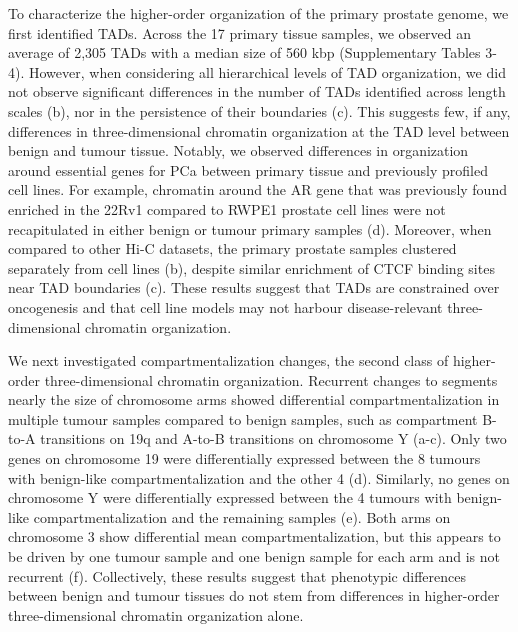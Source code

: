 To characterize the higher-order organization of the primary prostate genome, we first identified TADs.
Across the 17 primary tissue samples, we observed an average of 2,305 TADs with a median size of 560 kbp (Supplementary Tables 3-4).
However, when considering all hierarchical levels of TAD organization, we did not observe significant differences in the number of TADs identified across length scales (b), nor in the persistence of their boundaries (c).
This suggests few, if any, differences in three-dimensional chromatin organization at the TAD level between benign and tumour tissue.
Notably, we observed differences in organization around essential genes for PCa between primary tissue and previously profiled cell lines.
For example, chromatin around the AR gene that was previously found enriched in the 22Rv1 compared to RWPE1 prostate cell lines \cite{rhieHighresolution3DEpigenomic2019} were not recapitulated in either benign or tumour primary samples (d).
Moreover, when compared to other Hi-C datasets, the primary prostate samples clustered separately from cell lines (b), despite similar enrichment of CTCF binding sites near TAD boundaries (c).
These results suggest that TADs are constrained over oncogenesis and that cell line models may not harbour disease-relevant three-dimensional chromatin organization.

We next investigated compartmentalization changes, the second class of higher-order three-dimensional chromatin organization.
Recurrent changes to segments nearly the size of chromosome arms showed differential compartmentalization in multiple tumour samples compared to benign samples, such as compartment B-to-A transitions on 19q and A-to-B transitions on chromosome Y (a-c).
Only two genes on chromosome 19 were differentially expressed between the 8 tumours with benign-like compartmentalization and the other 4 (d).
Similarly, no genes on chromosome Y were differentially expressed between the 4 tumours with benign-like compartmentalization and the remaining samples (e).
Both arms on chromosome 3 show differential mean compartmentalization, but this appears to be driven by one tumour sample and one benign sample for each arm and is not recurrent (f).
Collectively, these results suggest that phenotypic differences between benign and tumour tissues do not stem from differences in higher-order three-dimensional chromatin organization alone.

